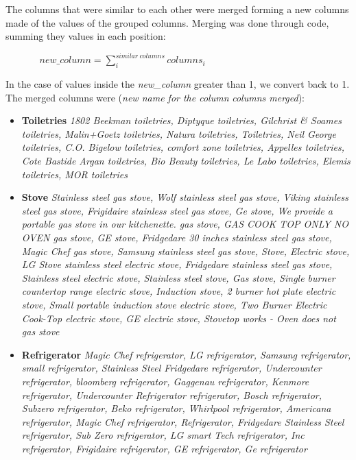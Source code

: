 The columns that were similar to each other were merged forming a new columns made of the values of the grouped columns. Merging was done through code, summing they values in each position:

$
	\ \ \ \	\ \ \ \	\ \ \ \	\ \ \ \		new\_column = \sum^{similar \ columns}_{i} columns_i
$

In the case of values inside the \textit{new\_column} greater than 1, we convert back to 1.
The merged columns were (\textit{new name for the column} \textrightarrow \textit{columns merged}):
\begin{itemize}
	\item \textbf{Toiletries} \textrightarrow \textit{1802 Beekman toiletries, Diptyque toiletries, Gilchrist \& Soames toiletries, Malin+Goetz toiletries, Natura toiletries, Toiletries, Neil George toiletries, C.O. Bigelow toiletries,  comfort zone  toiletries, Appelles toiletries, Cote Bastide Argan toiletries, Bio Beauty toiletries, Le Labo toiletries, Elemis toiletries, MOR toiletries}
	\item \textbf{Stove} \textrightarrow \textit{Stainless steel gas stove, Wolf stainless steel gas stove, Viking stainless steel gas stove, Frigidaire stainless steel gas stove, Ge stove, We provide a portable gas stove in our kitchenette.  gas stove, GAS COOK TOP ONLY NO OVEN gas stove, GE stove, Fridgedare 30 inches stainless steel gas stove, Magic Chef  gas stove, Samsung stainless steel gas stove, Stove, Electric stove, LG Stove stainless steel electric stove, Fridgedare stainless steel gas stove, Stainless steel electric stove, Stainless steel stove, Gas stove, Single burner countertop range electric stove, Induction stove, 2 burner hot plate electric stove, Small portable induction stove  electric stove, Two Burner Electric Cook-Top electric stove, GE  electric stove, Stovetop works - Oven does not gas stove}
	\item \textbf{Refrigerator} \textrightarrow \textit{Magic Chef refrigerator, LG refrigerator, Samsung refrigerator, small  refrigerator, Stainless Steel Fridgedare refrigerator, Undercounter refrigerator, bloomberg refrigerator, Gaggenau refrigerator, Kenmore refrigerator, Undercounter Refrigerator refrigerator, Bosch refrigerator, Subzero refrigerator, Beko refrigerator, Whirlpool refrigerator, Americana refrigerator, Magic Chef  refrigerator, Refrigerator, Fridgedare Stainless Steel refrigerator, Sub Zero refrigerator, LG smart Tech refrigerator, Inc refrigerator, Frigidaire refrigerator, GE refrigerator, Ge refrigerator}

\end{itemize}
